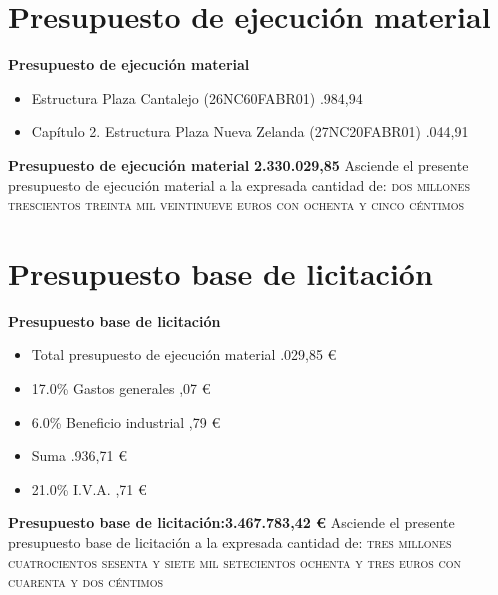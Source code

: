 \documentclass{book}%
\begin{document}
\chapter*{Presupuesto de ejecución material}%
\label{sec:Presupuestodeejecucinmaterial}%
\cleardoublepage%
\begin{center}%
\Large%
\textbf{Presupuesto de ejecución material}%
\large%
\end{center}%
\vspace*{2cm}%
\begin{itemize}%
\item%
Estructura Plaza Cantalejo (26NC60FABR01)%
.984,94%
\item%
Capítulo 2. Estructura Plaza Nueva Zelanda (27NC20FABR01)%
.044,91%
\end{itemize}%
\textbf{Presupuesto de ejecución material}%
\dotfill%
\textbf{2.330.029,85}%
\vspace*{0.5cm}%
\newline%
Asciende el presente presupuesto de ejecución material a la expresada cantidad de: %
\textsc{dos millones trescientos treinta mil veintinueve euros con ochenta y cinco céntimos}%


%
\chapter*{Presupuesto base de licitación}%
\label{sec:Presupuestobasedelicitacin}%
\cleardoublepage%
\begin{center}%
\Large%
\textbf{Presupuesto base de licitación}%
\large%
\end{center}%
\vspace*{2cm}%
\begin{itemize}%
\item%
Total presupuesto de ejecución material %
.029,85 €%
\item%
17.0\% Gastos generales %
,07 €%
\item%
6.0\% Beneficio industrial %
,79 €%
\item%
Suma %
.936,71 €%
\item%
21.0\% I.V.A. %
,71 €%
\end{itemize}%
\textbf{Presupuesto base de licitación:}\dotfill\textbf{3.467.783,42 €}%
\vspace*{0.5cm}%
\newline%
Asciende el presente presupuesto base de licitación a la expresada cantidad de: %
\textsc{tres millones cuatrocientos sesenta y siete mil setecientos ochenta y tres euros con cuarenta y dos céntimos}%


%
\end{document}
